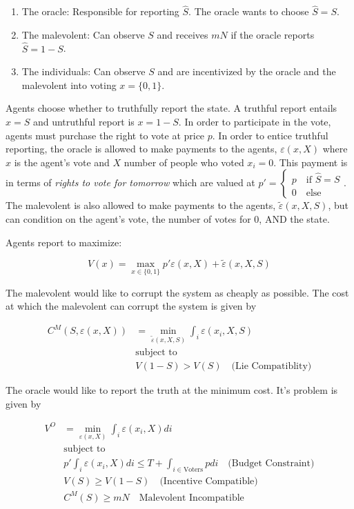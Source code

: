 \documentclass[12pt]{article}
\begin{document}
  \begin{enumerate}
    \item The oracle: Responsible for reporting $\hat{S}$. The oracle wants to choose $\hat{S} = S$.
    \item The malevolent: Can observe $S$ and receives $mN$ if the oracle reports $\hat{S} = 1 - S$.
    \item The individuals: Can observe $S$ and are incentivized by the oracle and the malevolent
    into voting $x = \{0, 1\}$.
  \end{enumerate}

  Agents choose whether to truthfully report the state. A truthful report entails $x = S$ and
  untruthful report is $x = 1 - S$. In order to participate in the vote, agents must purchase the
  right to vote at price $p$. In order to entice truthful reporting, the oracle is allowed to make
  payments to the agents, $\varepsilon(x, X)$ where $x$ is the agent's vote and $X$ number of people
  who voted $x_i = 0$. This payment is in terms of \textit{rights to vote for tomorrow} which are
  valued at $p' = \begin{cases} p \quad \text{if } \hat{S} = S \\ 0 \quad \text{else}\end{cases}$.
  The malevolent is also allowed to make payments to the agents, $\tilde{\varepsilon}(x, X, S)$, but
  can condition on the agent's vote, the number of votes for 0, AND the state.

  Agents report to maximize:

  $$V(x) = \max_{x \in \{0, 1\}} p' \varepsilon(x, X) + \tilde{\varepsilon}(x, X, S)$$

  The malevolent would like to corrupt the system as cheaply as possible. The cost at which the
  malevolent can corrupt the system is given by

  \begin{align*}
    C^M(S, \varepsilon(x, X)) &= \min_{\tilde{\varepsilon}(x, X, S)} \int_i \varepsilon(x_i, X, S) \\
    &\text{subject to} \\
    &V(1 - S) > V(S) \quad \text{(Lie Compatiblity)}
  \end{align*}

  The oracle would like to report the truth at the minimum cost. It's problem is given by

  \begin{align*}
    V^O &= \min_{\varepsilon(x, X)} \int_i \varepsilon(x_i, X) di \\
    &\text{subject to } \\
    &p' \int_i \varepsilon(x_i, X) di \leq T + \int_{i \in \text{Voters}} p di \quad \text{(Budget Constraint)} \\
    &V(S) \geq V(1 - S) \quad \text{(Incentive Compatible)} \\
    &C^M(S) \geq mN \quad \text{Malevolent Incompatible}
  \end{align*}
\end{document}
